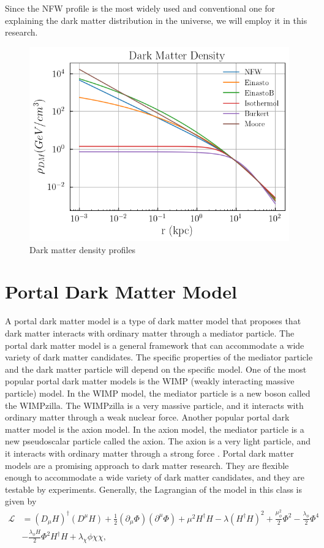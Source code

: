 \documentclass[10pt, oneside]{book}
\numberwithin{equation}{chapter}
\begin{document}
Since the NFW profile is the most widely used and conventional one for explaining the dark matter distribution in the universe, we will employ it in this research.
\begin{figure}
    \centering
    \includegraphics[width=0.6\linewidth]{images/Dark Matter Density.png}
    \caption{Dark matter density profiles}
    \label{fig: DM density}
\end{figure}

\section{Portal Dark Matter Model}
A portal dark matter model \cite{Pongkitivanichkul:2019cvm} is a type of dark matter model that proposes that dark matter interacts with ordinary matter through a mediator particle. The portal dark matter model is a general framework that can accommodate a wide variety of dark matter candidates. The specific properties of the mediator particle and the dark matter particle will depend on the specific model.
One of the most popular portal dark matter models is the WIMP (weakly interacting massive particle) model. In the WIMP model, the mediator particle is a new boson called the WIMPzilla. The WIMPzilla is a very massive particle, and it interacts with ordinary matter through a weak nuclear force.
Another popular portal dark matter model is the axion model. In the axion model, the mediator particle is a new pseudoscalar particle called the axion. The axion is a very light particle, and it interacts with ordinary matter through a strong force \cite{Klangburam:2021vli}.
Portal dark matter models are a promising approach to dark matter research. They are flexible enough to accommodate a wide variety of dark matter candidates, and they are testable by experiments. Generally, the Lagrangian of the model in this class is given by
\begin{equation}\label{DM model}
	\begin{split}
		\mathcal{L}&=(D_\mu H)^\dagger(D^\mu H)+\frac{1}{2}(\partial_\mu\Phi)(\partial^\mu\Phi)+\mu^2H^\dagger H-\lambda(H^\dagger H)^2+\frac{\mu^2_\phi}{2}\Phi^2-\frac{\lambda_\phi}{2}\Phi^4\\&-\frac{\lambda_\phi H}{2}\Phi^2 H^\dagger H+\lambda_\chi\phi\chi\chi,
	\end{split}
\end{equation}
\end{document}
